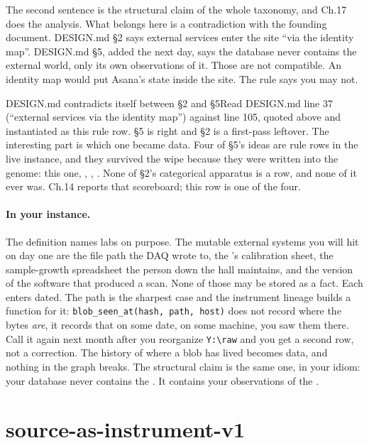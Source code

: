 The second sentence is the structural claim of the whole taxonomy, and Ch.17 does the analysis. What belongs here is a contradiction with the founding document. DESIGN.md \S2 says external services enter the site ``via the identity map''. DESIGN.md \S5, added the next day, says the database never contains the external world, only its own observations of it. Those are not compatible. An identity map would put Asana's state inside the site. The rule says you may not.

\begin{Correspondence}{DESIGN.md contradicts itself between \S2 and \S5}{Read DESIGN.md line 37 (``external services via the identity map'') against line 105, quoted above and instantiated as this rule row.}
\S5 is right and \S2 is a first-pass leftover. The interesting part is which one became data. Four of \S5's ideas are rule rows in the live instance, and they survived the wipe because they were written into the genome: this one, , , . None of \S2's categorical apparatus is a row, and none of it ever was. Ch.14 reports that scoreboard; this row is one of the four.
\end{Correspondence}

\paragraph{In your instance.} The definition names labs on purpose. The mutable external systems you will hit on day one are the file path the DAQ wrote to, the \labColdSystemShort's calibration sheet, the sample-growth spreadsheet the person down the hall maintains, and the version of the \labInstrumentVendor{} software that produced a scan. None of those may be stored as a fact. Each enters dated. The path is the sharpest case and the instrument lineage builds a function for it: \texttt{blob\_seen\_at(hash, path, host)} does not record where the bytes \emph{are}, it records that on some date, on some machine, you saw them there. Call it again next month after you reorganize \texttt{Y:\textbackslash raw} and you get a second row, not a correction. The history of where a blob has lived becomes data, and nothing in the graph breaks. The structural claim is the same one, in your idiom: your database never contains the \labColdSystemShort. It contains your observations of the \labColdSystemShort.

\section{source-as-instrument-v1}

